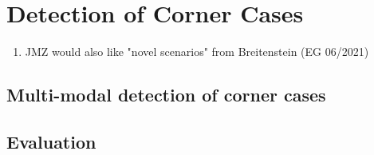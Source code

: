 \chapter{Detection of Corner Cases}
\label{chap:detection}

\begin{enumerate}
    \item JMZ would also like "novel scenarios" from Breitenstein (EG 06/2021)
\end{enumerate}

\section{Multi-modal detection of corner cases}
\label{sec:sensorik}

\section{Evaluation}

